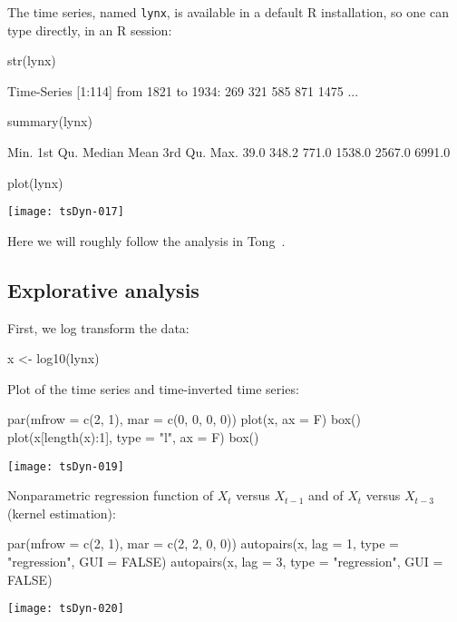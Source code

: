 \documentclass[a4paper]{article}
\begin{document}
The time series, named \texttt{lynx}, is available in a default R installation, so one can type directly, in an R session:
\begin{Schunk}
\begin{Sinput}
 str(lynx)
\end{Sinput}
\begin{Soutput}
 Time-Series [1:114] from 1821 to 1934:  269  321  585  871 1475 ...
\end{Soutput}
\begin{Sinput}
 summary(lynx)
\end{Sinput}
\begin{Soutput}
   Min. 1st Qu.  Median    Mean 3rd Qu.    Max. 
   39.0   348.2   771.0  1538.0  2567.0  6991.0 
\end{Soutput}
\begin{Sinput}
 plot(lynx)
\end{Sinput}
\end{Schunk}
\texttt{[image: tsDyn-017]}

Here we will roughly follow the analysis in Tong~\cite{Tong1990}.

\subsection{Explorative analysis}
First, we log transform the data:
\begin{Schunk}
\begin{Sinput}
 x <- log10(lynx)
\end{Sinput}
\end{Schunk}

Plot of the time series and time-inverted time series:
\begin{Schunk}
\begin{Sinput}
 par(mfrow = c(2, 1), mar = c(0, 0, 0, 0))
 plot(x, ax = F)
 box()
 plot(x[length(x):1], type = "l", ax = F)
 box()
\end{Sinput}
\end{Schunk}
\texttt{[image: tsDyn-019]}

Nonparametric regression function of $X_t$ versus $X_{t-1}$ and of $X_t$ versus $X_{t-3}$ (kernel estimation):
\begin{Schunk}
\begin{Sinput}
 par(mfrow = c(2, 1), mar = c(2, 2, 0, 0))
 autopairs(x, lag = 1, type = "regression", GUI = FALSE)
 autopairs(x, lag = 3, type = "regression", GUI = FALSE)
\end{Sinput}
\end{Schunk}
\texttt{[image: tsDyn-020]}
\end{document}
